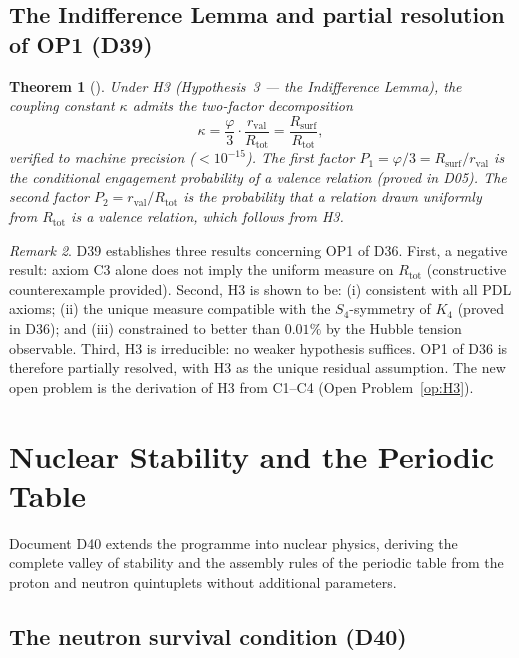 \documentclass[11pt,a4paper]{article}
\theoremstyle{plain}
\newtheorem{theorem}{Theorem}[section]
\theoremstyle{definition}
\theoremstyle{remark}
\newtheorem{remark}[theorem]{Remark}
\newcommand{\Kfour}{K_4}
\newcommand{\rval}{r_{\mathrm{val}}}
\newcommand{\Rsurf}{R_{\mathrm{surf}}}
\newcommand{\Rtot}{R_{\mathrm{tot}}}
\begin{document}
\subsection{The Indifference Lemma and partial resolution of OP1 (D39)}
\label{subsec:d39}

\begin{theorem}[\citep{D39}]
\label{thm:D39}
Under H3 (Hypothesis~3 — the Indifference Lemma), the coupling constant $\kappa$ admits the two-factor decomposition
\[
\kappa = \frac{\varphi}{3}\cdot\frac{\rval}{\Rtot} = \frac{\Rsurf}{\Rtot},
\]
verified to machine precision ($<10^{-15}$).
The first factor $P_1 = \varphi/3 = \Rsurf/\rval$ is the conditional engagement probability of a valence relation (proved in D05).
The second factor $P_2 = \rval/\Rtot$ is the probability that a relation drawn uniformly from $\Rtot$ is a valence relation, which follows from H3.
\end{theorem}

\begin{remark}
D39 establishes three results concerning OP1 of D36.
First, a negative result: axiom C3 alone does not imply the uniform measure on $\Rtot$ (constructive counterexample provided).
Second, H3 is shown to be: (i) consistent with all PDL axioms; (ii) the unique measure compatible with the $S_4$-symmetry of $\Kfour$ (proved in D36); and (iii) constrained to better than $0.01\%$ by the Hubble tension observable.
Third, H3 is irreducible: no weaker hypothesis suffices.
OP1 of D36 is therefore partially resolved, with H3 as the unique residual assumption.
The new open problem is the derivation of H3 from C1--C4 (Open Problem~\ref{op:H3}).
\end{remark}

\section{Nuclear Stability and the Periodic Table}
\label{sec:nuclear}

Document D40 extends the programme into nuclear physics, deriving the complete valley of stability and the assembly rules of the periodic table from the proton and neutron quintuplets without additional parameters.

\subsection{The neutron survival condition (D40)}
\label{subsec:neutron_survival}
\end{document}
